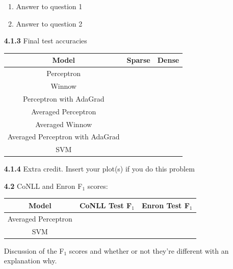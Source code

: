 \documentclass{article}
\begin{document}
\begin{enumerate}
    \begin{enumerate}
        \item Answer to question 1
        \item Answer to question 2
    \end{enumerate}

    \item[\textbf{4.1.3}]
    Final test accuracies
    \begin{center}
        \begin{tabular}{|c|c|c|}
            \hline
            Model & Sparse & Dense \\
            \hline
            Perceptron & & \\
            Winnow & & \\
            Perceptron with AdaGrad & & \\
            Averaged Perceptron & & \\
            Averaged Winnow & & \\
            Averaged Perceptron with AdaGrad & & \\
            SVM & & \\
            \hline
        \end{tabular}
    \end{center}

    \item[\textbf{4.1.4}]
    Extra credit. Insert your plot(s) if you do this problem

    \item[\textbf{4.2}]
    CoNLL and Enron F$_1$ scores:
    \begin{center}
        \begin{tabular}{|c|c|c|}
            \hline
            Model & CoNLL Test F$_1$ & Enron Test F$_1$ \\
            \hline
            Averaged Perceptron & & \\
            SVM & & \\
            \hline
        \end{tabular}
    \end{center}
    Discussion of the F$_1$ scores and whether or not they're different with an explanation why.

\end{enumerate}
\end{document}
